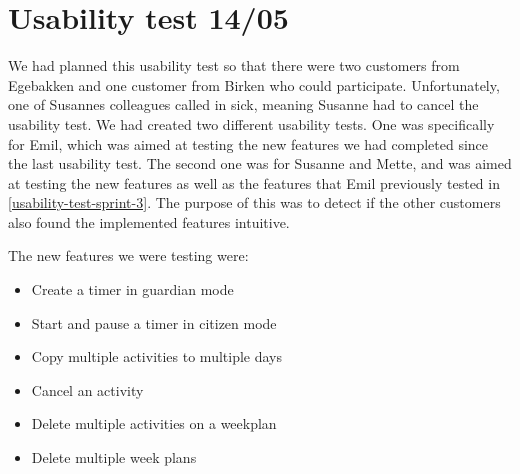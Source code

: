 \section{Usability test 14/05}\label{usability-test-14-05}
We had planned this usability test so that there were two customers from Egebakken and one customer from Birken who could participate.
Unfortunately, one of Susannes colleagues called in sick, meaning Susanne had to cancel the usability test.
We had created two different usability tests. 
One was specifically for Emil, which was aimed at testing the new features we had completed since the last usability test.
The second one was for Susanne and Mette, and was aimed at testing the new features as well as the features that Emil previously tested in \autoref{usability-test-sprint-3}. 
The purpose of this was to detect if the other customers also found the implemented features intuitive.

The new features we were testing were:

\begin{itemize}
  \item Create a timer in guardian mode
  \item Start and pause a timer in citizen mode
  \item Copy multiple activities to multiple days
  \item Cancel an activity
  \item Delete multiple activities on a weekplan
  \item Delete multiple week plans
\end{itemize}



